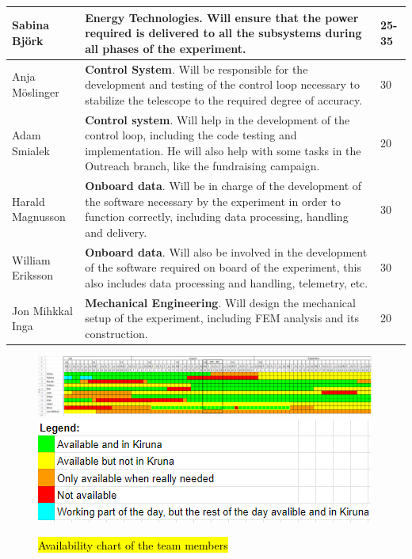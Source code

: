 \begin{longtable}{m{} | m{} | m{}}
	Sabina Bj{\"o}rk & \textbf{Energy Technologies}. Will ensure that the power required is delivered to all the subsystems during all phases of the experiment. & 25-35 \\ \hline
	Anja M{\"o}slinger & \textbf{Control System}. Will be responsible for the development and testing of the control loop necessary to stabilize the telescope to the required degree of accuracy. & 30 \\ \hline
	Adam Smialek & \textbf{Control system}.  Will help in the development of the control loop, including the code testing and implementation. He will also help with some tasks in the Outreach branch, like the fundraising campaign. & 20 \\ \hline
	Harald Magnusson & \textbf{Onboard data}. Will be in charge of the development of the software necessary by the experiment in order to function correctly, including data processing, handling and delivery. & 30 \\ \hline
	William Eriksson & \textbf{Onboard data}. Will also be involved in the development of the software required on board of the experiment, this also includes data processing and handling, telemetry, etc. & 30 \\ \hline
	Jon Mihkkal Inga & \textbf{Mechanical Engineering}. Will design the mechanical setup of the experiment, including FEM analysis and its construction. & 20 \\ \hline

\end{longtable}

\newpage
\begin{landscape}
	\begin{figure}[H]
		\includegraphics[scale=1.2]{3-project-planning/img/availability.png}
		\includegraphics[scale=1.2]{3-project-planning/img/Availability_legend.png}
		\caption{\hl{Availability chart of the team members}}
	\end{figure}
\end{landscape}

